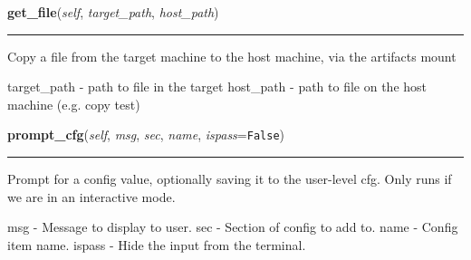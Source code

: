     \label{shutit_global:ShutIt:get_file}

    \vspace{0.5ex}

\hspace{.8\funcindent}\begin{boxedminipage}{\funcwidth}

    \raggedright \textbf{get\_file}(\textit{self}, \textit{target\_path}, \textit{host\_path})

    \vspace{-1.5ex}

    \rule{\textwidth}{0.5\fboxrule}
\setlength{\parskip}{2ex}
    Copy a file from the target machine to the host machine, via the 
    artifacts mount

    target\_path - path to file in the target host\_path      - path to 
    file on the host machine (e.g. copy test)

\setlength{\parskip}{1ex}
    \end{boxedminipage}

    \label{shutit_global:ShutIt:prompt_cfg}

    \vspace{0.5ex}

\hspace{.8\funcindent}\begin{boxedminipage}{\funcwidth}

    \raggedright \textbf{prompt\_cfg}(\textit{self}, \textit{msg}, \textit{sec}, \textit{name}, \textit{ispass}={\tt False})

    \vspace{-1.5ex}

    \rule{\textwidth}{0.5\fboxrule}
\setlength{\parskip}{2ex}
    Prompt for a config value, optionally saving it to the user-level cfg. 
    Only runs if we are in an interactive mode.

    msg    - Message to display to user. sec    - Section of config to add 
    to. name   - Config item name. ispass - Hide the input from the 
    terminal.

\setlength{\parskip}{1ex}
    \end{boxedminipage}

    \label{shutit_global:ShutIt:step_through}

